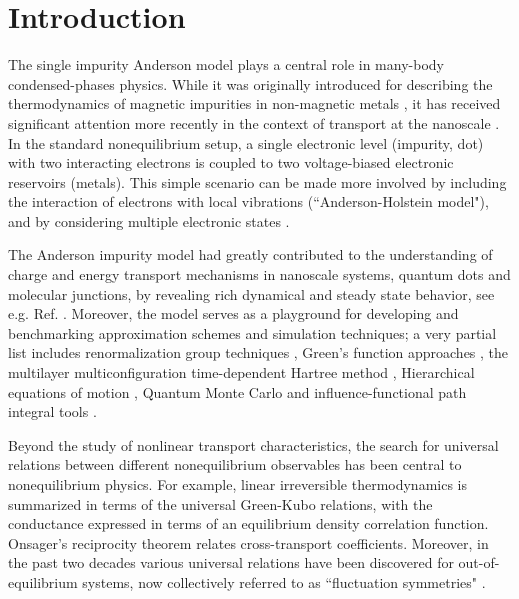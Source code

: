 \documentclass[aps,pra,twocolumn,groupedaddress,showpacs,superscriptaddress,amssymb,amsmath]{revtex4-1}
\begin{document}
\section{Introduction}
\label{Sintro}

The single impurity Anderson model \cite{Anderson} plays a central role 
in many-body condensed-phases physics. While it was originally introduced for describing the
thermodynamics of magnetic impurities in non-magnetic metals \cite{Kondo}, it has
received significant attention more recently in the context of transport at the nanoscale \cite{Galperin-review}.
In the standard nonequilibrium setup, a single electronic level (impurity, dot) with two interacting electrons
is coupled to two voltage-biased electronic reservoirs (metals).
This simple scenario can be made more involved by including the interaction of electrons with 
local vibrations (``Anderson-Holstein model"), and by considering multiple electronic states \cite{Galperin-review}.


The Anderson impurity model had greatly contributed to the 
understanding of charge and energy transport mechanisms        
in nanoscale systems, quantum dots and molecular junctions, by
revealing rich dynamical and steady state behavior, see e.g.  Ref. \cite{GalperinS}.
Moreover, the model serves as a playground for developing and benchmarking 
approximation schemes and simulation techniques; %
a very partial list includes 
renormalization group techniques \cite{Wilson, RG}, Green's function approaches \cite{MW93,Galperin-review},
the multilayer multiconfiguration time-dependent Hartree method \cite{Wang1,Wang2,Wang3,Rabani14}, 
Hierarchical equations of motion \cite{HEOM1,HEOM2,HEOM3},
Quantum Monte Carlo \cite{Lothar,Coheninch,CohenHT} and influence-functional path integral tools \cite{egger1,egger2,IF1,IF2}.

Beyond the study of nonlinear transport characteristics, the search for universal relations between 
different nonequilibrium observables has been central to nonequilibrium physics. 
For example, linear irreversible thermodynamics is summarized in terms of the universal Green-Kubo relations, 
with the conductance expressed in terms of an equilibrium density correlation function. 
Onsager's reciprocity theorem relates cross-transport coefficients. 
Moreover, in the past two decades various universal relations have been discovered for out-of-equilibrium systems,
now collectively referred to as ``fluctuation symmetries" \cite{fluc1,fluc2}. 
\end{document}
